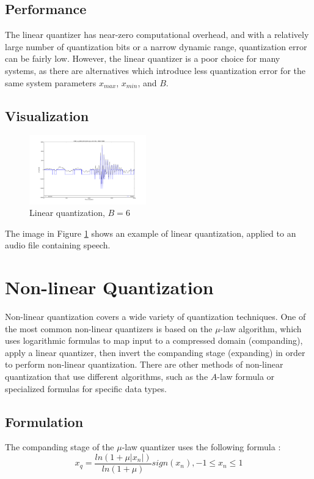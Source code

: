 \documentclass[journal]{IEEEtran}
\begin{document}
\subsection{Performance}
The linear quantizer has near-zero computational overhead, and with a relatively large number of quantization bits or a narrow 
dynamic range, quantization error can be fairly low. However, the linear quantizer is a poor choice for many systems, as there are
alternatives which introduce less quantization error for the same system parameters $x_{max}$, $x_{min}$, and $B$.

\subsection{Visualization}
\begin{figure}[h!]
\centering
  \includegraphics[width=0.45\textwidth]{linear_6bit.png}
\caption{Linear quantization, $B = 6$}
\label{fig:linear}
\end{figure}
The image in Figure \ref{fig:linear} shows an example of linear quantization, applied to an audio file containing speech. 

\section{Non-linear Quantization}
Non-linear quantization covers a wide variety of quantization techniques. One of the most common non-linear quantizers is based on the 
$\mu$-law algorithm, which uses logarithmic formulas to map input to a compressed domain (companding), apply a linear quantizer, then
invert the companding stage (expanding) in order to perform non-linear quantization. There are other methods of non-linear quantization that use
different algorithms, such as the $A$-law formula or specialized formulas for specific data types. 

\subsection{Formulation}
The companding stage of the $\mu$-law quantizer uses the following formula \cite{CiscoWeb}:
\begin{equation}
    x_q = \frac{ln(1 + \mu \lvert x_n \rvert)}{ln(1 + \mu)}sign(x_n), -1 \le x_n \le 1  
\end{equation}
\end{document}
